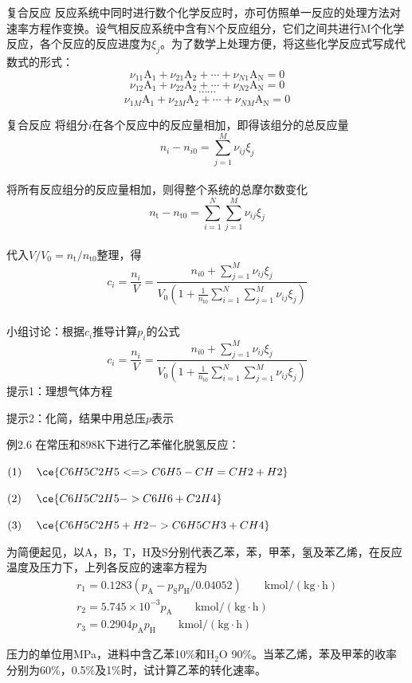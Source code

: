 \begin{frame}{复合反应}
    反应系统中同时进行数个化学反应时，亦可仿照单一反应的处理方法对速率方程作变换。设气相反应系统中含有N个反应组分，它们之间共进行M个化学反应，各个反应的反应进度为$\xi_j$。为了数学上处理方便，将这些化学反应式写成代数式的形式：
    $$\nu_{11}\mathrm{A_1}+\nu_{21}\mathrm{A_2}+\cdots+\nu_{N1}\mathrm{A_N} = 0$$
    $$\nu_{12}\mathrm{A_1}+\nu_{22}\mathrm{A_2}+\cdots+\nu_{N2}\mathrm{A_N} = 0$$
    $$\cdots \cdots$$
    $$\nu_{1M}\mathrm{A_1}+\nu_{2M}\mathrm{A_2}+\cdots+\nu_{NM}\mathrm{A_N} = 0$$
\end{frame}


\begin{frame}{复合反应}
    将组分$i$在各个反应中的反应量相加，即得该组分的总反应量
    $$n_i-n_{i0}=\sum_{j=1}^{M}\nu_{ij}\xi_j$$
    \\将所有反应组分的反应量相加，则得整个系统的总摩尔数变化
    $$n_\mathrm{t}-n_\mathrm{t0}=\sum_{i=1}^{N}\sum_{j=1}^{M}\nu_{ij}\xi_j$$
    \\代入$V/V_0=n_\mathrm{t}/n_\mathrm{t0}$整理，得
    $$c_i=\frac{n_i}{V}=\frac{n_{i0}+\sum_{j=1}^{M}\nu_{ij}\xi_j}{V_0(1+\frac{1}{n_\mathrm{t0}}\sum_{i=1}^{N}\sum_{j=1}^{M}\nu_{ij}\xi_j)}$$
\end{frame}


\begin{frame}[t]
    \frametitle{}
    \begin{redblock}{小组讨论：根据$c_i$推导计算$p_i$的公式}
        \[
            c_i=\frac{n_i}{V}=\frac{n_{i0}+\sum_{j=1}^{M}\nu_{ij}\xi_j}{V_0(1+\frac{1}{n_\mathrm{t0}}\sum_{i=1}^{N}\sum_{j=1}^{M}\nu_{ij}\xi_j)}
        \]
        \tcblower
        提示1：理想气体方程

        提示2：化简，结果中用总压$p$表示
    \end{redblock}
\end{frame}


\begin{frame}[t]{}
    \begin{block}{例2.6}
        在常压和898K下进行乙苯催化脱氢反应：
    
        $(1)~~~~\ce{C6H5C2H5 <=> C6H5-CH=CH2 + H2}$
    
        $(2)~~~~\ce{C6H5C2H5 -> C6H6 + C2H4}$
    
        $(3)~~~~\ce{C6H5C2H5 + H2 -> C6H5CH3 + CH4}$
    
        为简便起见，以A，B，T，H及S分别代表乙苯，苯，甲苯，氢及苯乙烯，在反应温度及压力下，上列各反应的速率方程为
    $$\begin{array}{l}
        r_{1}=0.1283\left(p_{\mathrm{A}}-p_{\mathrm{S}} p_{\mathrm{H}} / 0.04052\right) \qquad\mathrm{kmol/(kg·h)}\\
        r_{2}=5.745 \times 10^{-3} p_{\mathrm{A}} \qquad\mathrm{kmol/(kg·h)}\\
        r_{3}=0.2904 p_{\mathrm{A}} p_{\mathrm{H}} \qquad\mathrm{kmol/(kg·h)}
    \end{array}$$
    \vspace{-1em}

    压力的单位用MPa，进料中含乙苯10\%和$\mathrm{H_2O}$ 90\%。当苯乙烯，苯及甲苯的收率分别为60\%，0.5\%及1\%时，试计算乙苯的转化速率。
    \end{block}
\end{frame}